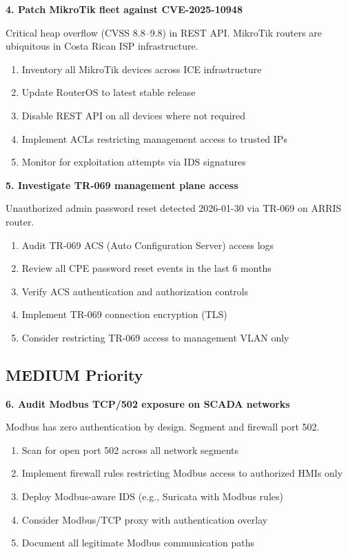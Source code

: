 \documentclass[11pt,a4paper]{article}
\begin{document}
\textbf{4. Patch MikroTik fleet against CVE-2025-10948}

Critical heap overflow (CVSS 8.8--9.8) in REST API. MikroTik routers are ubiquitous in Costa Rican ISP infrastructure.

\begin{enumerate}[label=\alph*., leftmargin=1.5cm]
\item Inventory all MikroTik devices across ICE infrastructure
\item Update RouterOS to latest stable release
\item Disable REST API on all devices where not required
\item Implement ACLs restricting management access to trusted IPs
\item Monitor for exploitation attempts via IDS signatures
\end{enumerate}

\textbf{5. Investigate TR-069 management plane access}

Unauthorized admin password reset detected 2026-01-30 via TR-069 on ARRIS router.

\begin{enumerate}[label=\alph*., leftmargin=1.5cm]
\item Audit TR-069 ACS (Auto Configuration Server) access logs
\item Review all CPE password reset events in the last 6 months
\item Verify ACS authentication and authorization controls
\item Implement TR-069 connection encryption (TLS)
\item Consider restricting TR-069 access to management VLAN only
\end{enumerate}

\subsection{MEDIUM Priority}

\textbf{6. Audit Modbus TCP/502 exposure on SCADA networks}

Modbus has zero authentication by design. Segment and firewall port 502.

\begin{enumerate}[label=\alph*., leftmargin=1.5cm]
\item Scan for open port 502 across all network segments
\item Implement firewall rules restricting Modbus access to authorized HMIs only
\item Deploy Modbus-aware IDS (e.g., Suricata with Modbus rules)
\item Consider Modbus/TCP proxy with authentication overlay
\item Document all legitimate Modbus communication paths
\end{enumerate}
\end{document}
